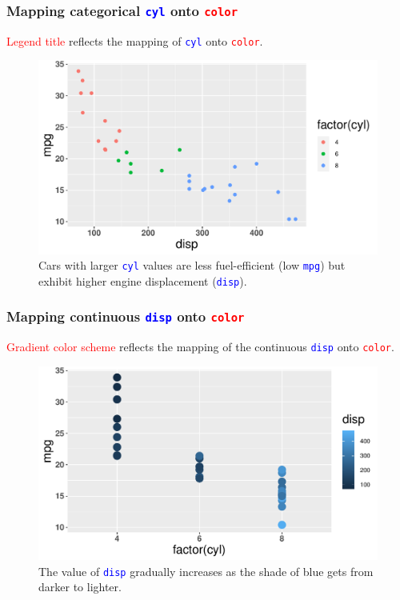 \documentclass{beamer}
\begin{document}
\begin{frame}\frametitle{Mapping categorical \textcolor{blue}{\texttt{cyl}} onto  \textcolor{red}{\texttt{color}}}
\textcolor{red}{Legend title} reflects the mapping of \textcolor{blue}{\texttt{cyl}} onto  \textcolor{red}{\texttt{color}}. 
\begin{figure}
\includegraphics[width=0.99\linewidth]{PlotsLec2/cyl_to_color}
\caption{{\small Cars with larger \textcolor{blue}{\texttt{cyl}} values are less fuel-efficient (low \textcolor{blue}{\texttt{mpg}}) but exhibit higher engine displacement (\textcolor{blue}{\texttt{disp}}).}}
\end{figure}
\end{frame}

\begin{frame}[fragile]\frametitle{Mapping continuous \textcolor{blue}{\texttt{disp}} onto  \textcolor{red}{\texttt{color}}}
\textcolor{red}{Gradient color scheme} reflects the mapping of the continuous \textcolor{blue}{\texttt{disp}} onto \textcolor{red}{\texttt{color}}. 
\begin{figure}
\includegraphics[width=0.99\linewidth]{PlotsLec2/disp_to_color}
\caption{{\small The value of \textcolor{blue}{\texttt{disp}} gradually increases as the shade of blue gets from darker to lighter.}}
\end{figure}
\end{frame}
\end{document}
